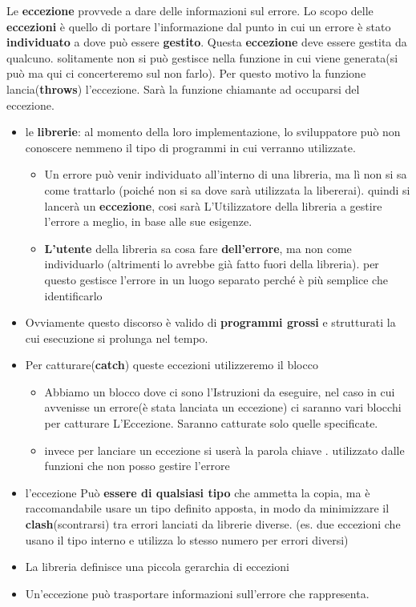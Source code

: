 Le \textbf{eccezione} provvede a dare delle informazioni sul errore. Lo scopo delle \textbf{eccezioni} è quello di portare l’informazione dal punto in cui un errore è stato \textbf{individuato} a dove può essere \textbf{gestito}. Questa \textbf{eccezione} deve essere gestita da qualcuno. solitamente non si può gestisce nella funzione in cui viene generata(si può ma qui ci concerteremo sul non farlo). Per questo motivo la funzione lancia(\textbf{throws}) l'eccezione. Sarà la funzione chiamante ad occuparsi del eccezione.
\begin{itemize}
    \item le \textbf{librerie}: al momento della
    loro implementazione, lo sviluppatore può non conoscere
    nemmeno il tipo di programmi in cui verranno utilizzate.
    \begin{itemize}
        \item Un errore può venir individuato all’interno di una libreria,
        ma lì non si sa come trattarlo (poiché non si sa dove sarà utilizzata la libererai). quindi si lancerà un \textbf{eccezione}, cosi sarà L'Utilizzatore della libreria a gestire l'errore a meglio, in base alle sue esigenze.
        
        \item \textbf{L’utente} della libreria sa cosa fare \textbf{dell’errore}, ma non come
        individuarlo (altrimenti lo avrebbe già fatto fuori della libreria). per questo gestisce l'errore in un luogo separato perché è più semplice che identificarlo
    \end{itemize}
    \item Ovviamente questo discorso è valido di \textbf{programmi grossi} e
    strutturati la cui esecuzione si prolunga nel tempo.
    
    \item Per catturare(\textbf{catch}) queste eccezioni utilizzeremo il blocco \textcolor{blue}{} 
    \begin{itemize}
        \item Abbiamo un blocco  \textcolor{blue}{} dove ci sono l'Istruzioni da eseguire, nel caso in cui avvenisse un errore(è stata lanciata un eccezione) ci saranno vari blocchi \textcolor{blue}{} per catturare L'Eccezione. Saranno catturate solo quelle specificate.
        \item invece per lanciare un eccezione si userà la parola chiave \textcolor{blue}{}. utilizzato dalle funzioni che non posso gestire l'errore
    \end{itemize}
    
    \item l'eccezione Può \textbf{essere di qualsiasi tipo} che ammetta la copia, ma è raccomandabile usare un tipo definito apposta, in modo da minimizzare il \textbf{clash}(scontrarsi) tra errori lanciati da librerie diverse. (es. due eccezioni che usano il tipo interno e utilizza lo stesso numero per errori diversi)
    \item La libreria \textcolor{blue}{} definisce una piccola gerarchia di eccezioni
    \item Un’eccezione può trasportare informazioni sull’errore che
rappresenta.
\end{itemize}
